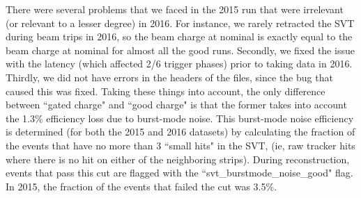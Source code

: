 \documentclass[11pt]{article}
\begin{document}
There were several problems that we faced in the 2015 run that were irrelevant (or relevant to a lesser degree) in 2016.  For instance, we rarely retracted the SVT during beam trips in 2016,
so the beam charge at nominal is exactly equal to the beam charge at nominal for almost all the good runs.
  Secondly, we fixed the issue with the latency (which affected 2/6 trigger phases) prior to taking data in 2016.  Thirdly, we did not have errors in the headers of the files, since the bug that caused this was fixed.   
Taking these things into account, the only difference between ``gated charge" and ``good charge" is that the former takes into account the 1.3\% efficiency loss due to burst-mode noise.  This burst-mode noise efficiency is determined (for both the 2015 and 2016 datasets) by calculating the fraction of the events that have no more than 3 ``small hits" in the SVT, (ie, raw tracker hits where there is no hit on either of the neighboring strips).  During reconstruction, events that pass this cut are flagged with the ``svt\_burstmode\_noise\_good" flag.  In 2015, the fraction of the events that failed the cut was 3.5\%.

\end{document}

